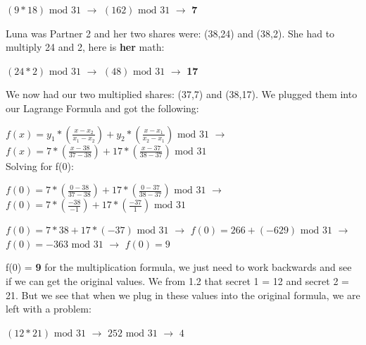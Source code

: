 \documentclass[10pt]{article}
\begin{document}
$\left(9*18\right) \textrm{ mod } 31$ $\rightarrow$
$\left(162\right) \textrm{ mod } 31$ $\rightarrow$ \textbf{7}\\
\newline

\noindent Luna was Partner 2 and her two shares were: (38,24) and (38,2). 
She had to multiply 24 and 2, here is \textbf{her} math:\\ \vspace{0.1in}

$\left(24*2\right) \textrm{ mod } 31$ $\rightarrow$
$\left(48\right) \textrm{ mod } 31$ $\rightarrow$ \textbf{17}\\
\newline

\noindent We now had our two multiplied shares: (37,7) and (38,17). We plugged them into our Lagrange Formula and got the following:\\ \vspace{0.1in}

$f(x) = y_1*\left(\frac{x - x_2}{x_1 - x_2}\right) + y_2*\left(\frac{x - x_1}{x_2 - x_1}\right) \textrm{ mod } 31$ 
$\rightarrow$
$f(x) = 7*\left(\frac{x - 38}{37 - 38}\right) + 17*\left(\frac{x - 37}{38 - 37}\right) \textrm{ mod } 31$\\

\noindent Solving for f(0):\\ \vspace{0.1in}

$f(0) = 7*\left(\frac{0 - 38}{37 - 38}\right) + 17*\left(\frac{0 - 37}{38 - 37}\right) \textrm{ mod } 31$
$\rightarrow$
$f(0) = 7*\left(\frac{-38}{-1}\right) + 17*\left(\frac{-37}{1}\right)  \textrm{ mod } 31$
\vspace{0.1in}

$f(0) = 7*38 + 17*(-37)  \textrm{ mod } 31$
$\rightarrow$
$f(0) = 266 + (-629)  \textrm{ mod } 31$
$\rightarrow$
$f(0) = -363  \textrm{ mod } 31$
$\rightarrow$
$f(0) = 9$

\vspace{0.1in}
\noindent f(0) = \textbf{9} for the multiplication formula, we just need to work backwards and see if we can get the original values. We from 1.2 that secret 1 = 12 and secret 2 = 21. But we see that when we plug in these values into the original formula, we are left with a problem: \\ \vspace{0.1in}


$(12 * 21) \textrm{ mod } 31$ 
$\rightarrow$
$252 \textrm{ mod } 31$
$\rightarrow$
$4$
\newline
\end{document}
